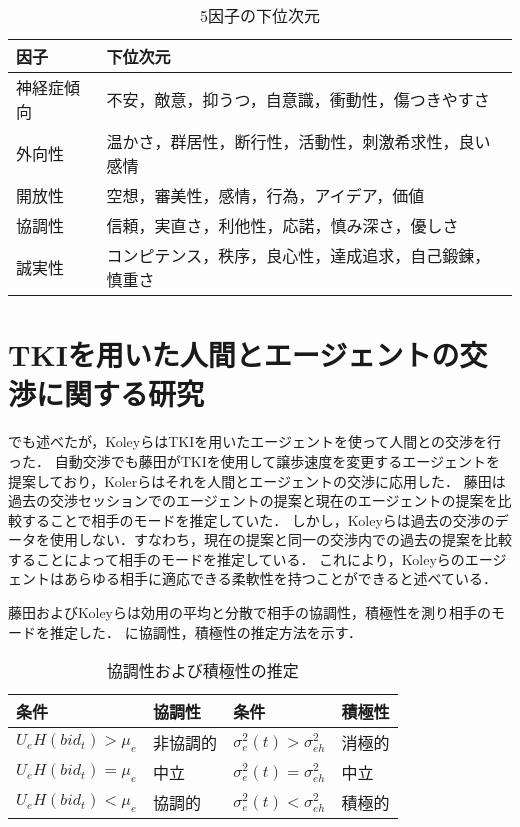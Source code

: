 \begin{table}[tb]
    \centering
    \caption[5因子の下位次元]{5因子の下位次元 \protect \footnotemark}
    \begin{tabular}{ll} \toprule
        因子 & 下位次元 \\ \midrule
        神経症傾向 & 不安，敵意，抑うつ，自意識，衝動性，傷つきやすさ \\
        外向性 & 温かさ，群居性，断行性，活動性，刺激希求性，良い感情 \\
        開放性 & 空想，審美性，感情，行為，アイデア，価値 \\
        協調性 & 信頼，実直さ，利他性，応諾，慎み深さ，優しさ \\
        誠実性 & コンピテンス，秩序，良心性，達成追求，自己鍛錬，慎重さ \\ \bottomrule
    \end{tabular}
    \label{tab:neo-pi-r}
\end{table}

\section{TKIを用いた人間とエージェントの交渉に関する研究}
でも述べたが，Koleyら\cite{tki-ha}はTKIを用いたエージェントを使って人間との交渉を行った．
自動交渉でも藤田\cite{tki-aa}がTKIを使用して譲歩速度を変更するエージェントを提案しており，Kolerらはそれを人間とエージェントの交渉に応用した．
藤田は過去の交渉セッションでのエージェントの提案と現在のエージェントの提案を比較することで相手のモードを推定していた．
しかし，Koleyらは過去の交渉のデータを使用しない．すなわち，現在の提案と同一の交渉内での過去の提案を比較することによって相手のモードを推定している．
これにより，Koleyらのエージェントはあらゆる相手に適応できる柔軟性を持つことができると述べている．

藤田およびKoleyらは効用の平均と分散で相手の協調性，積極性を測り相手のモードを推定した．
に協調性，積極性の推定方法を示す．

\begin{table}[tb]
    \centering
    \caption[協調性および積極性の推定]{協調性および積極性の推定 \protect \footnotemark}
    \begin{tabular}{llll} \toprule
        条件 & 協調性 & 条件 & 積極性 \\ \midrule
        $U_eH(bid_t)>\mu_e$ & 非協調的 & $\sigma^2_e(t)>\sigma^2_{eh}$ & 消極的 \\
        $U_eH(bid_t)=\mu_e$ & 中立 & $\sigma^2_e(t)=\sigma^2_{eh}$ & 中立 \\
        $U_eH(bid_t)<\mu_e$ & 協調的 & $\sigma^2_e(t)<\sigma^2_{eh}$ & 積極的\\ \bottomrule
    \end{tabular}
    \label{tab:tki-metrics}
\end{table}

